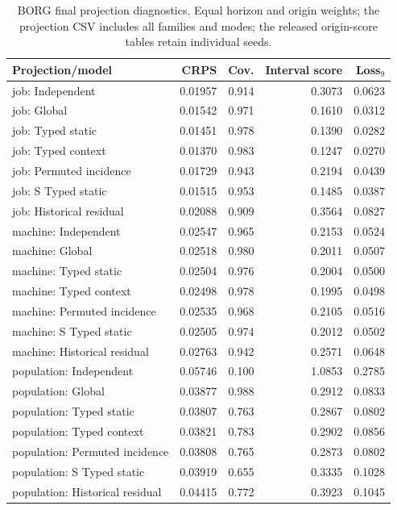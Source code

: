 \begin{table}[t]
\centering\small
\caption{BORG final projection diagnostics. Equal horizon and origin weights; the projection CSV includes all families and modes; the released origin-score tables retain individual seeds.}\label{tab:borgprojection}
\begin{tabular}{lrrrr}
\toprule
Projection/model & CRPS & Cov. & Interval score & Loss$_9$ \\
\midrule
job: Independent & 0.01957 & 0.914 & 0.3073 & 0.0623 \\
job: Global & 0.01542 & 0.971 & 0.1610 & 0.0312 \\
job: Typed static & 0.01451 & 0.978 & 0.1390 & 0.0282 \\
job: Typed context & 0.01370 & 0.983 & 0.1247 & 0.0270 \\
job: Permuted incidence & 0.01729 & 0.943 & 0.2194 & 0.0439 \\
job: S Typed static & 0.01515 & 0.953 & 0.1485 & 0.0387 \\
job: Historical residual & 0.02088 & 0.909 & 0.3564 & 0.0827 \\
machine: Independent & 0.02547 & 0.965 & 0.2153 & 0.0524 \\
machine: Global & 0.02518 & 0.980 & 0.2011 & 0.0507 \\
machine: Typed static & 0.02504 & 0.976 & 0.2004 & 0.0500 \\
machine: Typed context & 0.02498 & 0.978 & 0.1995 & 0.0498 \\
machine: Permuted incidence & 0.02535 & 0.968 & 0.2105 & 0.0516 \\
machine: S Typed static & 0.02505 & 0.974 & 0.2012 & 0.0502 \\
machine: Historical residual & 0.02763 & 0.942 & 0.2571 & 0.0648 \\
population: Independent & 0.05746 & 0.100 & 1.0853 & 0.2785 \\
population: Global & 0.03877 & 0.988 & 0.2912 & 0.0833 \\
population: Typed static & 0.03807 & 0.763 & 0.2867 & 0.0802 \\
population: Typed context & 0.03821 & 0.783 & 0.2902 & 0.0856 \\
population: Permuted incidence & 0.03808 & 0.765 & 0.2873 & 0.0802 \\
population: S Typed static & 0.03919 & 0.655 & 0.3335 & 0.1028 \\
population: Historical residual & 0.04415 & 0.772 & 0.3923 & 0.1045 \\
\bottomrule
\end{tabular}
\end{table}

